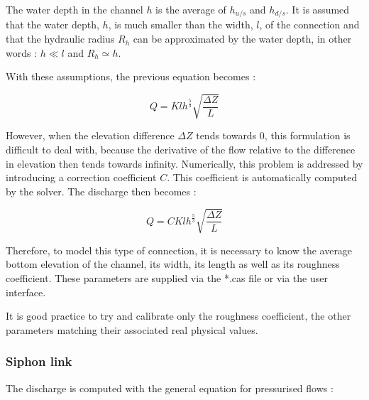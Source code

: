 \vspace{0.5cm}

The water depth in the channel $h$ is the average of $h_{u/s}$ and $h_{d/s}$. It is assumed that the water depth, $h$, is much smaller than the width, $l$, of the connection and that the hydraulic radius $R_h$ can be approximated by the water depth, in other words : $h \ll l$ and $R_h \simeq h$.

\vspace{0.5cm}

With these assumptions, the previous equation becomes :

\begin{equation}
 Q = K l h^{\frac{5}{3}} \sqrt{\frac{\Delta Z}{L}}
\end{equation}

\vspace{0.5cm}

However, when the elevation difference $\Delta Z$ tends towards $0$, this formulation is difficult to deal with, because the derivative of the flow relative to the difference in elevation then tends towards infinity. Numerically, this problem is addressed by introducing a correction coefficient $C$. This coefficient is automatically computed by the solver. The discharge then becomes :

\begin{equation}
 Q = C K l h^{\frac{5}{3}} \sqrt{\frac{\Delta Z}{L}}
\end{equation}

\vspace{0.5cm}

Therefore, to model this type of connection, it is necessary to know the average bottom elevation of the channel, its width, its length as well as its roughness coefficient. These parameters are supplied via the *.cas file or via the user interface.

\vspace{0.5cm}

It is good practice to try and calibrate only the roughness coefficient, the other parameters matching their associated real physical values.



\subsubsection{Siphon link}

The discharge is computed with the general equation for pressurised flows :


